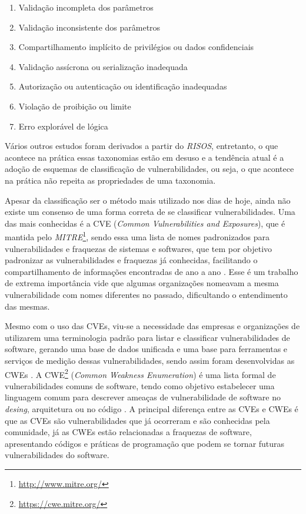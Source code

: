 \begin{enumerate}
  \item Validação incompleta dos parâmetros
  \item Validação inconsistente dos parâmetros
  \item Compartilhamento implícito de privilégios ou dados confidenciais
  \item Validação assícrona ou serialização inadequada
  \item Autorização ou autenticação ou identificação inadequadas
  \item Violação de proibição ou limite
  \item Erro explorável de lógica
\end{enumerate}

Vários outros estudos foram derivados a partir do \textit{RISOS}, entretanto, o
que acontece na prática essas taxonomias estão em desuso e a tendência atual é a
adoção de esquemas de classificação de vulnerabilidades, ou seja, o que acontece
na prática não repeita as propriedades de uma taxonomia.

Apesar da classificação ser o método mais utilizado nos dias de hoje, ainda não
existe um consenso de uma forma correta de se classificar vulnerabilidades. Uma
das mais conhecidas é a CVE (\textit{Common Vulnerabilities and Exposures}), que
é mantida pelo \textit{MITRE}\footnote{\url{http://www.mitre.org/}}, sendo essa
uma lista de nomes padronizados para vulnerabilidades e fraquezas de sistemas e
softwares, que tem por objetivo padronizar as vulnerabilidades e fraquezas já
conhecidas, facilitando o compartilhamento de informações encontradas de ano a
ano \cite{gregio:2005}. Esse é um trabalho de extrema importância vide que
algumas organizações nomeavam a mesma vulnerabilidade com nomes diferentes no
passado, dificultando o entendimento das mesmas.

Mesmo com o uso das CVEs, viu-se a necessidade das empresas e organizações de
utilizarem uma terminologia padrão para listar e classificar vulnerabilidades de
software, gerando uma base de dados unificada e uma base para ferramentas e
serviços de medição dessas vulnerabilidades, sendo assim foram desenvolvidas as
CWEs \cite{arthur&carlos2014}. A CWE\footnote{\url{https://cwe.mitre.org/}}
(\textit{Common Weakness Enumeration}) é uma lista formal de vulnerabilidades
comuns de software, tendo como objetivo estabelecer uma linguagem comum para
descrever ameaças de vulnerabilidade de software no \textit{desing}, arquitetura
ou no código \cite{arthur&carlos2014}.  A principal diferença entre as CVEs e
CWEs é que as CVEs são vulnerabilidades que já ocorreram e são conhecidas pela
comunidade, já as CWEs estão relacionadas a fraquezas de software, apresentando
códigos e práticas de programação que podem se tornar futuras vulnerabilidades
do software.


